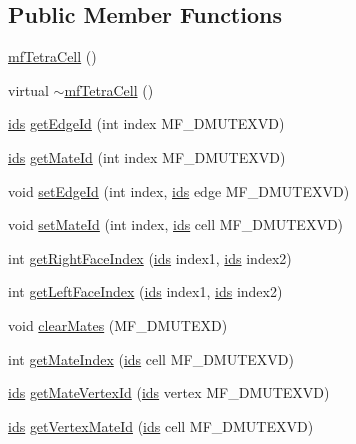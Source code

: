\subsection*{Public Member Functions}
\begin{DoxyCompactItemize}
\item 
\hyperlink{classmf_1_1mfTetraCell_a2e18ff7f38ded3a98cb44a44dc955fd5}{mfTetraCell} ()
\item 
virtual \hyperlink{classmf_1_1mfTetraCell_ae1a1b462e99342bf35614f1c09e1c630}{$\sim$mfTetraCell} ()
\item 
\hyperlink{classmf_1_1mfBase_a3b23f16ddf59da0a91ab12cf57c1f111}{ids} \hyperlink{classmf_1_1mfTetraCell_a3b34d618f13b889fd1dfa008bdd79541}{getEdgeId} (int index MF\_\-DMUTEXVD)
\item 
\hyperlink{classmf_1_1mfBase_a3b23f16ddf59da0a91ab12cf57c1f111}{ids} \hyperlink{classmf_1_1mfTetraCell_a946fd7394f718ef614076d3a15314b07}{getMateId} (int index MF\_\-DMUTEXVD)
\item 
void \hyperlink{classmf_1_1mfTetraCell_af6231dd16c5fb6e20aebd9f9127cd138}{setEdgeId} (int index, \hyperlink{classmf_1_1mfBase_a3b23f16ddf59da0a91ab12cf57c1f111}{ids} edge MF\_\-DMUTEXVD)
\item 
void \hyperlink{classmf_1_1mfTetraCell_acbe15a78f605cfbbc8f62acc3cf4bc0a}{setMateId} (int index, \hyperlink{classmf_1_1mfBase_a3b23f16ddf59da0a91ab12cf57c1f111}{ids} cell MF\_\-DMUTEXVD)
\item 
int \hyperlink{classmf_1_1mfTetraCell_a0a4f78f89482e6a45cbe2556cf8fa496}{getRightFaceIndex} (\hyperlink{classmf_1_1mfBase_a3b23f16ddf59da0a91ab12cf57c1f111}{ids} index1, \hyperlink{classmf_1_1mfBase_a3b23f16ddf59da0a91ab12cf57c1f111}{ids} index2)
\item 
int \hyperlink{classmf_1_1mfTetraCell_a2b8f436018c47313fbd98d6ef63e8d3d}{getLeftFaceIndex} (\hyperlink{classmf_1_1mfBase_a3b23f16ddf59da0a91ab12cf57c1f111}{ids} index1, \hyperlink{classmf_1_1mfBase_a3b23f16ddf59da0a91ab12cf57c1f111}{ids} index2)
\item 
void \hyperlink{classmf_1_1mfTetraCell_a9e553dc8c297b53756f44a9782facf5c}{clearMates} (MF\_\-DMUTEXD)
\item 
int \hyperlink{classmf_1_1mfTetraCell_a6fb6c0adb551ec4bbefe01c4e71ec443}{getMateIndex} (\hyperlink{classmf_1_1mfBase_a3b23f16ddf59da0a91ab12cf57c1f111}{ids} cell MF\_\-DMUTEXVD)
\item 
\hyperlink{classmf_1_1mfBase_a3b23f16ddf59da0a91ab12cf57c1f111}{ids} \hyperlink{classmf_1_1mfTetraCell_a0e5f9859616dfa35c3409fa5649c195c}{getMateVertexId} (\hyperlink{classmf_1_1mfBase_a3b23f16ddf59da0a91ab12cf57c1f111}{ids} vertex MF\_\-DMUTEXVD)
\item 
\hyperlink{classmf_1_1mfBase_a3b23f16ddf59da0a91ab12cf57c1f111}{ids} \hyperlink{classmf_1_1mfTetraCell_aad9f514199dea3408d6a14d0bb1f9f97}{getVertexMateId} (\hyperlink{classmf_1_1mfBase_a3b23f16ddf59da0a91ab12cf57c1f111}{ids} cell MF\_\-DMUTEXVD)
\end{DoxyCompactItemize}
